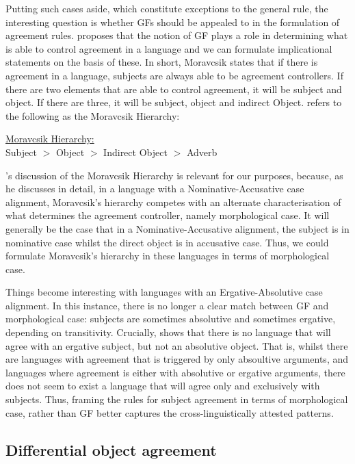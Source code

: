 \documentclass[output=paper
,modfonts
,nonflat]{langsci/langscibook}
\begin{document}
\noindent Putting such cases aside, which constitute exceptions to the general rule, the interesting question is whether GFs should be appealed to in the formulation of agreement rules. 
\citet{Moravcsik1974,moravcsik1978} proposes that the notion of GF plays a role in determining what is able to control agreement in a language and we can formulate implicational statements on the basis of these. 
In short, Moravcsik states that if there is agreement in a language, subjects are always able to be agreement controllers.
If there are two elements that are able to control agreement, it will be subject and object. 
If there are three, it will be subject, object and indirect Object. 
\citet{Bobaljik2008} refers to the following as the Moravcsik Hierarchy:

\begin{exe}
\ex
\underline{Moravcsik Hierarchy:}\\
Subject $>$ Object $>$ Indirect Object $>$ Adverb
\end{exe}

\noindent \citeauthor{Bobaljik2008}'s discussion of the Moravcsik Hierarchy is relevant for our purposes, because, as he discusses in detail, in a language with a Nominative-Accusative case alignment, Moravcsik's hierarchy competes with an alternate characterisation of what determines the agreement controller, namely morphological case. 
It will generally be the case that in a Nominative-Accusative alignment, the subject is in nominative case whilst the direct object is in accusative case. 
Thus, we could formulate Moravcsik's hierarchy in these languages in terms of morphological case.

Things become interesting with languages with an Ergative-Absolutive case alignment. In this instance, there is no longer a clear match between GF and morphological case: subjects are sometimes absolutive and sometimes ergative, depending on transitivity. Crucially, \citeauthor{Bobaljik2008} shows that there is no language that will agree with an ergative subject, but not an absolutive object.
That is, whilst there are languages with agreement that is triggered by only absoultive arguments, and languages where agreement is either with absolutive or ergative arguments, there does not seem to exist a language that will agree only and exclusively with subjects.
Thus, framing the rules for subject agreement in terms of morphological case, rather than GF better captures the cross-linguistically attested patterns. 

\subsection{Differential object agreement}
\end{document}
